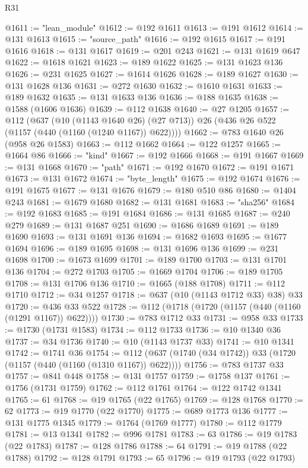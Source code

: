 \begin{lexlean}{R31}
\begin{coremodule}
@1611 := "lean_module"
@1612 := @192 @1611
@1613 := @191 @1612
@1614 := @131 @1613
@1615 := "source_path"
@1616 := @192 @1615
@1617 := @191 @1616
@1618 := @131 @1617
@1619 := @201 @243
@1621 := @131 @1619 @647
@1622 := @1618 @1621
@1623 := @189 @1622
@1625 := @131 @1623 @136
@1626 := @231 @1625
@1627 := @1614 @1626
@1628 := @189 @1627
@1630 := @131 @1628 @136
@1631 := @272 @1630
@1632 := @1610 @1631
@1633 := @189 @1632
@1635 := @131 @1633 @136
@1636 := @188 @1635
@1638 := @1588 (@1606 @1636)
@1639 := @112 @1638
@1640 := @27 @1205
@1657 := @112
    (@637
      (@10 (@1143 @1640 @26) (@27 @713))
      @26
      (@436 @26 @522 (@1157 (@440 (@1160 (@1240 @1167)) @622))))
@1662 := @783 @1640 @26 (@958 @26 @1583)
@1663 := @112 @1662
@1664 := @122 @1257
@1665 := @1664 @86
@1666 := "kind"
@1667 := @192 @1666
@1668 := @191 @1667
@1669 := @131 @1668
@1670 := "path"
@1671 := @192 @1670
@1672 := @191 @1671
@1673 := @131 @1672
@1674 := "byte_length"
@1675 := @192 @1674
@1676 := @191 @1675
@1677 := @131 @1676
@1679 := @180 @510 @86
@1680 := @1404 @243
@1681 := @1679 @1680
@1682 := @131 @1681
@1683 := "sha256"
@1684 := @192 @1683
@1685 := @191 @1684
@1686 := @131 @1685
@1687 := @240 @279
@1689 := @131 @1687 @251
@1690 := @1686 @1689
@1691 := @189 @1690
@1693 := @131 @1691 @136
@1694 := @1682 @1693
@1695 := @1677 @1694
@1696 := @189 @1695
@1698 := @131 @1696 @136
@1699 := @231 @1698
@1700 := @1673 @1699
@1701 := @189 @1700
@1703 := @131 @1701 @136
@1704 := @272 @1703
@1705 := @1669 @1704
@1706 := @189 @1705
@1708 := @131 @1706 @136
@1710 := @1665 (@188 @1708)
@1711 := @112 @1710
@1712 := @34 @1257
@1718 := @637 (@10 (@1143 @1712 @33) @38) @33
@1720 := @436 @33 @522
@1728 := @112 (@1718 (@1720 (@1157 (@440 (@1160 (@1291 @1167)) @622))))
@1730 := @783 @1712 @33
@1731 := @958 @33
@1733 := @1730 (@1731 @1583)
@1734 := @112 @1733
@1736 := @10 @1340 @36
@1737 := @34 @1736
@1740 := @10 (@1143 @1737 @33)
@1741 := @10 @1341
@1742 := @1741 @36
@1754 := @112 (@637 (@1740 (@34 @1742)) @33 (@1720 (@1157 (@440 (@1160 (@1310 @1167)) @622))))
@1756 := @783 @1737 @33
@1757 := @841 @448
@1758 := @131 @1757
@1759 := @1758 @137
@1761 := @1756 (@1731 @1759)
@1762 := @112 @1761
@1764 := @122 @1742 @1341
@1765 := 61
@1768 := @19 @1765 (@22 @1765)
@1769 := @128 @1768
@1770 := 62
@1773 := @19 @1770 (@22 @1770)
@1775 := @689 @1773 @136
@1777 := @131 @1775 @1345
@1779 := @1764 (@1769 @1777)
@1780 := @112 @1779
@1781 := @13 @1341
@1782 := @996 @1781
@1783 := 63
@1786 := @19 @1783 (@22 @1783)
@1787 := @128 @1786
@1788 := 64
@1791 := @19 @1788 (@22 @1788)
@1792 := @128 @1791
@1793 := 65
@1796 := @19 @1793 (@22 @1793)

\end{coremodule}
\end{lexlean}
